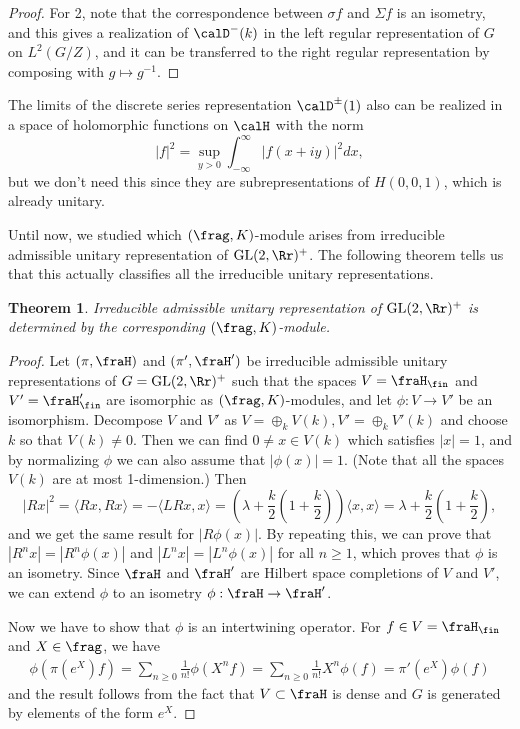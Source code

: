 \documentclass{article}
\newtheorem{theorem}{Theorem}[section]
\newcommand{\GL}{\mathrm{GL}}
\begin{document}
\begin{proof}
For 2, note that the correspondence between $\sigma f$ and $\Sigma f$ is an isometry, and this gives a realization of $\calD^{-}(k)$ in the left regular representation of $G$ on $L^{2}(G/Z)$, and it can be transferred to the right regular representation by composing with $g\mapsto g^{-1}$. 
\end{proof}

The limits of the discrete series representation $\calD^{\pm}(1)$ also can be realized in a space of holomorphic functions on $\calH$ with the norm 
$$
|f|^{2} = \sup_{y>0}  \int_{-\infty}^{\infty} |f(x+iy)|^{2} dx,
$$
but we don't need this since they are subrepresentations of $H(0, 0, 1)$, which is already unitary. 

Until now, we studied which $(\frag, K)$-module arises from irreducible admissible unitary representation of $\GL(2, \Rr)^{+}$. The following theorem tells us that this actually classifies all the irreducible unitary representations. 
\begin{theorem}
\label{unigk}
Irreducible admissible unitary representation of $\GL(2, \Rr)^{+}$ is determined by the corresponding $(\frag, K)$-module. 
\end{theorem}
\begin{proof}
Let $(\pi, \fraH)$ and $(\pi', \fraH')$ be irreducible admissible unitary representations of $G = \GL(2, \Rr)^{+}$ such that the spaces $V = \fraH_{\fin}$ and $V' = \fraH_{\fin}'$ are isomorphic as $(\frag, K)$-modules, and let $\phi:V\to V'$ be an isomorphism. 
Decompose $V$ and $V'$ as $V = \oplus_{k} V(k), V' = \oplus_{k} V'(k)$ and choose $k$ so that $V(k)\neq 0$. 
Then we can find $0\neq x\in V(k)$ which satisfies $|x| = 1$, and by normalizing $\phi$ we can also assume that $|\phi(x)| = 1$. (Note that all the spaces $V(k)$ are at most 1-dimension.) 
Then 
$$
|Rx|^{2} = \langle Rx, Rx\rangle = -\langle LRx, x\rangle = \left(\lambda + \frac{k}{2}\left(1+\frac{k}{2}\right)\right) \langle x, x\rangle = \lambda + \frac{k}{2}\left(1+\frac{k}{2}\right), 
$$
and we get the same result for $|R\phi(x)|$. By repeating this, we can prove that $|R^{n}x| = |R^{n}\phi(x)|$ and $|L^{n}x| = |L^{n}\phi(x)|$ for all $n\geq 1$, which proves that $\phi$ is an isometry. Since $\fraH$ and $\fraH'$ are Hilbert space completions of $V$ and $V'$, we can extend $\phi$ to an isometry $\phi:\fraH\to \fraH'$. 

Now we have to show that $\phi$ is an intertwining operator. For $f\in V = \fraH_{\fin}$ and $X\in \frag$, we have
\begin{align*}
\phi(\pi(e^{X})f) = \sum_{n\geq 0} \frac{1}{n!} \phi(X^{n}f) = \sum_{n\geq 0} \frac{1}{n!}X^{n}\phi(f) = \pi'(e^{X})\phi(f)
\end{align*}
and the result follows from the fact that $V\subset \fraH$ is dense and $G$ is generated by elements of the form $e^{X}$. 
\end{proof}
\end{document}

